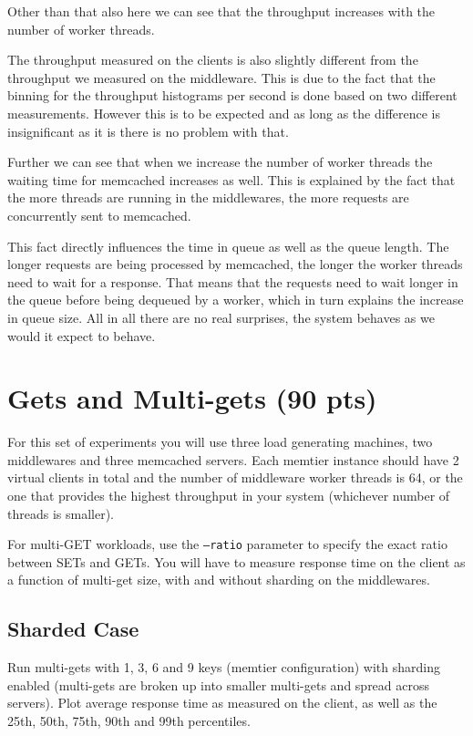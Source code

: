 \documentclass[11pt,a4paper]{article}
\begin{document}
%
Other than that also here we can see that the throughput increases with the number of worker threads.
%
\par
%
The throughput measured on the clients is also slightly different from the throughput we measured on the middleware. 
%
This is due to the fact that the binning for the throughput histograms per second is done based on two different measurements.
%
However this is to be expected and as long as the difference is insignificant as it is there is no problem with that.
%
\par
%
Further we can see that when we increase the number of worker threads the waiting time for memcached increases as well.
%
This is explained by the fact that the more threads are running in the middlewares, the more requests are concurrently sent to memcached.
%
\par
%
This fact directly influences the time in queue as well as the queue length.
%
The longer requests are being processed by memcached, the longer the worker threads need to wait for a response.
%
That means that the requests need to wait longer in the queue before being dequeued by a worker, which in turn explains the increase in queue size.
%
All in all there are no real surprises, the system behaves as we would it expect to behave.

\section{Gets and Multi-gets (90 pts)}

For this set of experiments you will use three load generating machines, two middlewares and three memcached servers. Each memtier instance should have 2 virtual clients in total and the number of middleware worker threads is 64, or the one that provides the highest throughput in your system (whichever number of threads is smaller).

For multi-GET workloads, use the \texttt{--ratio} parameter to specify the exact ratio between SETs and GETs. You will have to measure response time on the client as a function of multi-get size, with and without sharding on the middlewares.

\subsection{Sharded Case}

Run multi-gets with 1, 3, 6 and 9 keys (memtier configuration) with sharding enabled (multi-gets are broken up into smaller multi-gets and spread across servers). Plot average response time as measured on the client, as well as the 25th, 50th, 75th, 90th and 99th percentiles.
\end{document}
